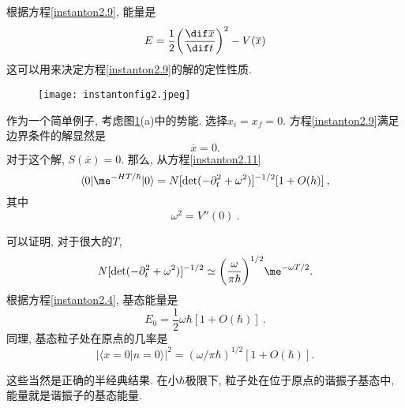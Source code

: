 根据方程\eqref{instanton2.9}, 能量是
\begin{equation}
    E=\frac{1}{2}\biggl(\frac{\dif\overline{x}}{\dif t}\biggr)^{2} - V(\overline{x})
\end{equation}
这可以用来决定方程\eqref{instanton2.9}的解的定性性质.

\begin{figure}[h]
    \centering
    \texttt{[image: instantonfig2.jpeg]}
    \caption{ \label{instantonfig2}}
  \end{figure}
作为一个简单例子, 考虑图\ref{instantonfig2}(a)中的势能. 选择$x_{i}=x_{f}=0$. 方程\eqref{instanton2.9}满足边界条件的解显然是
\begin{equation}
    \overline{x}=0 . \label{instanton2.13}
\end{equation}
对于这个解, $S(\overline{x})=0$. 那么, 从方程\eqref{instanton2.11}
\begin{equation}
    \langle 0 \vert \me^{-HT/\hbar} \vert 0\rangle = 
    N[\det(-\partial_{t}^{2}+\omega^{2})]^{-1/2}[1+O(h)] \:, \label{instanton2.14}
\end{equation}
其中
\begin{equation}
    \omega^{2}=V''(0) \:. \label{instanton2.15}
\end{equation}

可以证明, 对于很大的$T$,
\begin{equation}
    N[\det(-\partial_{t}^{2}+\omega^{2})]^{-1/2} \simeq \biggl(\frac{\omega}{\pi\hbar}\biggr)^{1/2}\me^{-\omega T/2}.  \label{instanton2.16}
\end{equation}
根据方程\eqref{instanton2.4}, 基态能量是
\begin{equation}
    E_{0}=\frac{1}{2}\omega\hbar[1+O(\hbar)] \:. \label{instanton2.17}
\end{equation}
同理, 基态粒子处在原点的几率是
\begin{equation}
     \bigl\lvert \langle x{=}0 \vert n{=}0 \rangle \bigr\rvert^{2} =
     (\omega/\pi\hbar)^{1/2}[1+O(\hbar)] .
\end{equation}

这些当然是正确的半经典结果. 在小$\hbar$极限下, 粒子处在位于原点的谐振子基态中, 能量就是谐振子的基态能量.


